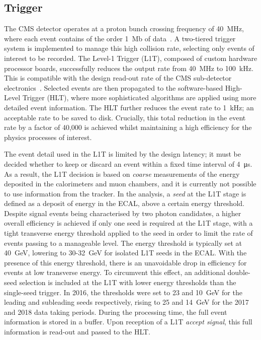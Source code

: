 
\subsection{Trigger}\label{sec:trigger}
The CMS detector operates at a proton bunch crossing frequency of 40~MHz, where each event contains of the order 1~Mb of data~\cite{Khachatryan:2016bia}. A two-tiered trigger system is implemented to manage this high collision rate, selecting only events of interest to be recorded. The Level-1 Trigger (L1T), composed of custom hardware processor boards, successfully reduces the output rate from 40~MHz to 100~kHz. This is compatible with the design read-out rate of the CMS sub-detector electronics~\cite{Sphicas:2002gg}. Selected events are then propagated to the software-based High-Level Trigger (HLT), where more sophisticated algorithms are applied using more detailed event information. The HLT further reduces the event rate to 1~kHz; an acceptable rate to be saved to disk. Crucially, this total reduction in the event rate by a factor of 40,000 is achieved whilst maintaining a high efficiency for the physics processes of interest.

The event detail used in the L1T is limited by the design latency; it must be decided whether to keep or discard an event within a fixed time interval of \SI{4}{\micro\second}. As a result, the L1T decision is based on \textit{coarse} measurements of the energy deposited in the calorimeters and muon chambers, and it is currently not possible to use information from the tracker. 
In the \Hgg analysis, a \textit{seed} at the L1T stage is defined as a deposit of energy in the ECAL, above a certain energy threshold. Despite signal events being characterised by two photon candidates, a higher overall efficiency is achieved if only one seed is required at the L1T stage, with a tight transverse energy threshold applied to the seed in order to limit the rate of events passing to a manageable level. The energy threshold is typically set at 40~GeV, lowering to 30-32~GeV for isolated L1T seeds in the ECAL. With the presence of this energy threshold, there is an unavoidable drop in efficiency for \Hgg events at low transverse energy. To circumvent this effect, an additional double-seed selection is included at the L1T with lower energy thresholds than the single-seed trigger. In 2016, the thresholds were set to 23 and 10~GeV for the leading and subleading seeds respectively, rising to 25 and 14~GeV for the 2017 and 2018 data taking periods.
During the processing time, the full event information is stored in a buffer. Upon reception of a L1T \textit{accept signal}, this full information is read-out and passed to the HLT.

